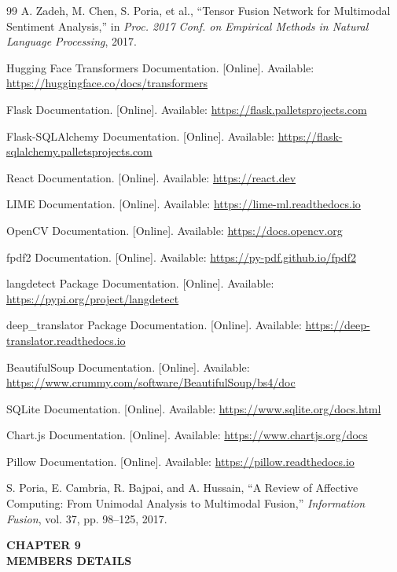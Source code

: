 \documentclass[12pt, a4paper]{report}
\begin{document}
\begin{thebibliography}{99}
A. Zadeh, M. Chen, S. Poria, et al., ``Tensor Fusion Network for Multimodal Sentiment Analysis,'' in \textit{Proc. 2017 Conf. on Empirical Methods in Natural Language Processing}, 2017.

Hugging Face Transformers Documentation. [Online]. Available: \url{https://huggingface.co/docs/transformers}

Flask Documentation. [Online]. Available: \url{https://flask.palletsprojects.com}

Flask-SQLAlchemy Documentation. [Online]. Available: \url{https://flask-sqlalchemy.palletsprojects.com}

React Documentation. [Online]. Available: \url{https://react.dev}

LIME Documentation. [Online]. Available: \url{https://lime-ml.readthedocs.io}

OpenCV Documentation. [Online]. Available: \url{https://docs.opencv.org}

fpdf2 Documentation. [Online]. Available: \url{https://py-pdf.github.io/fpdf2}

langdetect Package Documentation. [Online]. Available: \url{https://pypi.org/project/langdetect}

deep\_translator Package Documentation. [Online]. Available: \url{https://deep-translator.readthedocs.io}

BeautifulSoup Documentation. [Online]. Available: \url{https://www.crummy.com/software/BeautifulSoup/bs4/doc}

SQLite Documentation. [Online]. Available: \url{https://www.sqlite.org/docs.html}

Chart.js Documentation. [Online]. Available: \url{https://www.chartjs.org/docs}

Pillow Documentation. [Online]. Available: \url{https://pillow.readthedocs.io}

S. Poria, E. Cambria, R. Bajpai, and A. Hussain, ``A Review of Affective Computing: From Unimodal Analysis to Multimodal Fusion,'' \textit{Information Fusion}, vol. 37, pp. 98--125, 2017.

\end{thebibliography}

\cleardoublepage
\thispagestyle{empty}
\vspace*{\fill}
\begin{center}
    {\fontsize{20}{24}\selectfont \textbf{CHAPTER 9}} \\[1cm]
    {\fontsize{24}{28}\selectfont \textbf{MEMBERS DETAILS}}
\end{center}
\vspace*{\fill}
\clearpage
\end{document}
